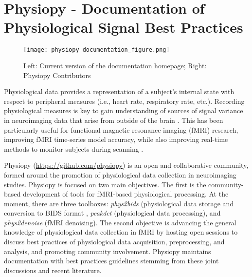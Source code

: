 \documentclass[../main.tex]{subfiles}
\begin{document}
\section{Physiopy - Documentation of Physiological Signal Best Practices}

%


\begin{figure}
	\centering
	\texttt{[image: physiopy-documentation\_figure.png]}
	\caption{Left: Current version of the documentation homepage; Right: Physiopy Contributors}
	\label{fig:physiopy_beforeafter}
\end{figure}


Physiological data provides a representation of a subject’s internal state with respect to peripheral measures (i.e., heart rate, respiratory rate, etc.). Recording physiological measures is key to gain understanding of sources of signal variance in neuroimaging data that arise from outside of the brain \parencite{chen2020}. This has been particularly useful for functional magnetic resonance imaging (fMRI) research, improving fMRI time-series model accuracy, while also improving real-time methods to monitor subjects during scanning \parencite{bulte2017, caballero-gaudes2017}. 

Physiopy (\url{https://github.com/physiopy}) is an open and collaborative community, formed around the promotion of physiological data collection in neuroimaging studies. Physiopy is focused on two main objectives. The first is the community-based development of tools for fMRI-based physiological processing. At the moment, there are three toolboxes: \textit{phys2bids} (physiological data storage and conversion to BIDS format \parencite{phys2bids}, \textit{peakdet} (physiological data processing), and \textit{phys2denoise} (fMRI denoising). The second objective is advancing the general knowledge of physiological data collection in fMRI by hosting open sessions to discuss best practices of physiological data acquisition, preprocessing, and analysis, and promoting community involvement. Physiopy maintains documentation with best practices guidelines stemming from these joint discussions and recent literature.
\end{document}
